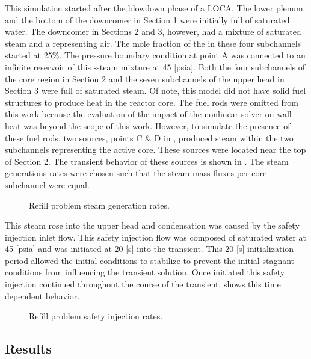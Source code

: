 This simulation started after the blowdown phase of a LOCA.
The lower plenum and the bottom of the downcomer in Section 1 were initially full of saturated water.
The downcomer in Sections 2 and 3, however, had a mixture of saturated steam and a \ncg{} representing air.
The mole fraction of the \ncgs{} in these four subchannels started at 25\%.
The pressure boundary condition at point A was connected to an infinite reservoir of this \ncg{}-steam mixture at 45 [psia]. 
Both the four subchannels of the core region in Section 2 and the seven subchannels of the upper head in Section 3 were full of saturated steam.
Of note, this model did not have solid fuel structures to produce heat in the reactor core.
The fuel rods were omitted from this work because the evaluation of the impact of the nonlinear solver on wall heat was beyond the scope of this work.
However, to simulate the presence of these fuel rods, two sources, points C \& D in , produced steam within the two subchannels representing the active core.
These sources were located near the top of Section 2.
The transient behavior of these sources is shown in .
The steam generations rates were chosen such that the steam mass fluxes per core subchannel were equal.

\begin{figure}[h!tb]
\centering

\caption{Refill problem steam generation rates.}
\label{fig:refillSteamRates}
\end{figure}

This steam rose into the upper head and condensation was caused by the safety injection inlet flow.
This safety injection flow was composed of saturated water at 45 [psia] and was initiated at 20 [s] into the transient.
This 20 [s] initialization period allowed the initial conditions to stabilize to prevent the initial stagnant conditions from influencing the transient solution.
Once initiated this safety injection continued throughout the course of the transient.
 shows this time dependent behavior.

\begin{figure}[h!tb]
\centering

\caption{Refill problem safety injection rates.}
\label{fig:refillSafetyInjection}
\end{figure}

\subsection{Results}
\label{sect:refillResults}

